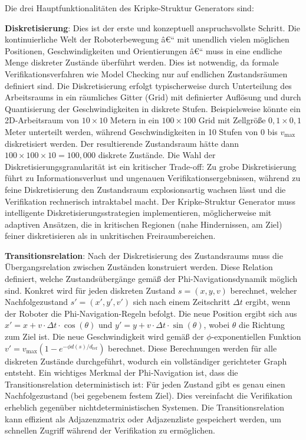 ﻿\documentclass[a4paper,12pt]{article}
\theoremstyle{definition}
\begin{document}
Die drei Hauptfunktionalitäten des Kripke-Struktur Generators sind:

\textbf{Diskretisierung}: Dies ist der erste und konzeptuell anspruchsvollste Schritt. Die kontinuierliche Welt der Roboterbewegung â€“ mit unendlich vielen möglichen Positionen, Geschwindigkeiten und Orientierungen â€“ muss in eine endliche Menge diskreter Zustände überführt werden. Dies ist notwendig, da formale Verifikationsverfahren wie Model Checking nur auf endlichen Zustandsräumen definiert sind. Die Diskretisierung erfolgt typischerweise durch Unterteilung des Arbeitsraums in ein räumliches Gitter (Grid) mit definierter Auflösung und durch Quantisierung der Geschwindigkeiten in diskrete Stufen. Beispielsweise könnte ein 2D-Arbeitsraum von $10 \times 10$ Metern in ein $100 \times 100$ Grid mit Zellgröße $0{,}1 \times 0{,}1$ Meter unterteilt werden, während Geschwindigkeiten in 10 Stufen von 0 bis $v_{\max}$ diskretisiert werden. Der resultierende Zustandsraum hätte dann $100 \times 100 \times 10 = 100{,}000$ diskrete Zustände. Die Wahl der Diskretisierungsgranularität ist ein kritischer Trade-off: Zu grobe Diskretisierung führt zu Informationsverlust und ungenauen Verifikationsergebnissen, während zu feine Diskretisierung den Zustandsraum explosionsartig wachsen lässt und die Verifikation rechnerisch intraktabel macht. Der Kripke-Struktur Generator muss intelligente Diskretisierungsstrategien implementieren, möglicherweise mit adaptiven Ansätzen, die in kritischen Regionen (nahe Hindernissen, am Ziel) feiner diskretisieren als in unkritischen Freiraumbereichen.

\textbf{Transitionsrelation}: Nach der Diskretisierung des Zustandsraums muss die Über\-gangs\-relation zwischen Zuständen konstruiert werden. Diese Relation definiert, welche Zustandsübergänge gemäß der Phi-Navigationsdynamik möglich sind. Konkret wird für jeden diskreten Zustand $s = (x, y, v)$ berechnet, welcher Nachfolgezustand $s' = (x', y', v')$ sich nach einem Zeitschritt $\Delta t$ ergibt, wenn der Roboter die Phi-Navigation-Regeln befolgt. Die neue Position ergibt sich aus $x' = x + v \cdot \Delta t \cdot \cos(\theta)$ und $y' = y + v \cdot \Delta t \cdot \sin(\theta)$, wobei $\theta$ die Richtung zum Ziel ist. Die neue Geschwindigkeit wird gemäß der $\phi$-exponentiellen Funktion $v' = v_{\max}(1 - e^{-\phi d(s)/d_{\text{ref}}})$ berechnet. Diese Berechnungen werden für alle diskreten Zustände durchgeführt, wodurch ein vollständiger gerichteter Graph entsteht. Ein wichtiges Merkmal der Phi-Navigation ist, dass die Transitionsrelation deterministisch ist: Für jeden Zustand gibt es genau einen Nachfolgezustand (bei gegebenem festem Ziel). Dies vereinfacht die Verifikation erheblich gegenüber nichtdeterministischen Systemen. Die Transitionsrelation kann effizient als Adjazenzmatrix oder Adjazenzliste gespeichert werden, um schnellen Zugriff während der Verifikation zu ermöglichen.
\end{document}
